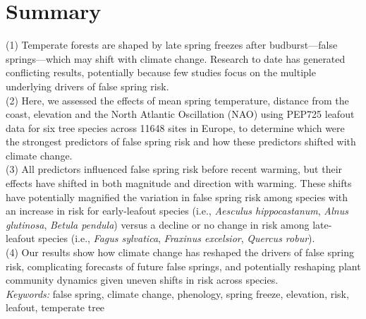 \documentclass{article}\usepackage[]{graphicx}\usepackage[]{color}
\begin{document}
\renewcommand{\thetable}{\arabic{table}}
\renewcommand{\thefigure}{\arabic{figure}}
\renewcommand{\labelitemi}{$-$}




\section*{Summary} %
(1) Temperate forests are shaped by late spring freezes after budburst---false springs---which may shift with climate change. Research to date has generated conflicting results, potentially because few studies focus on the multiple underlying drivers of false spring risk.  \\
(2) Here, we assessed the effects of mean spring temperature, distance from the coast, elevation and the North Atlantic Oscillation (NAO) using PEP725 leafout data for six tree species across 11648 sites in Europe, to determine which were the strongest predictors of false spring risk and how these predictors shifted with climate change. \\
(3) All predictors influenced false spring risk before recent warming, but their effects have shifted in both magnitude and direction with warming. These shifts have potentially magnified the variation in false spring risk among species with an increase in risk for early-leafout species (i.e., \textit{Aesculus hippocastanum}, \textit{Alnus glutinosa}, \textit{Betula pendula}) versus a decline or no change in risk among late-leafout species (i.e., \textit{Fagus sylvatica}, \textit{Fraxinus excelsior}, \textit{Quercus robur}). \\
(4) Our results show how climate change has reshaped the drivers of false spring risk, complicating forecasts of future false springs, and potentially reshaping plant community dynamics given uneven shifts in risk across species. \\

\vspace{2ex}
\textit{Keywords:} false spring, climate change, phenology, spring freeze, elevation, risk, leafout, temperate tree %
\end{document}
